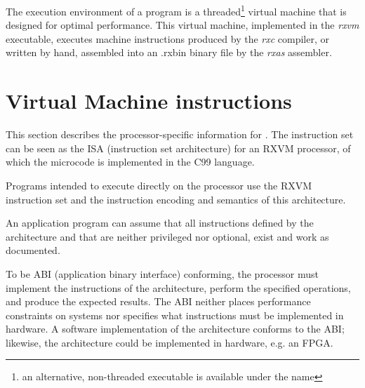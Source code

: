 The execution environment of a \crexx{} program is a
threaded\footnote{an alternative, non-threaded executable is available
  under the \emph{} name} virtual
machine that is designed for optimal performance. This virtual
machine, implemented in the \emph{rxvm} executable, executes
machine instructions produced by the \emph{rxc} \crexx{}
compiler, or written by hand, assembled into an .rxbin binary file by
the \emph{rxas} assembler.



\section{\crexx{} Virtual Machine instructions}

This section describes the processor-specific information for
. The instruction set can be seen as the ISA
(instruction set architecture) for
an RXVM processor, of which the microcode is implemented in the C99 language.

Programs intended to execute directly on the processor use the
RXVM instruction set and the
instruction encoding and semantics of this architecture.

An application program can assume that all instructions defined by the
architecture and that are neither privileged nor optional, exist and work
as documented.

To be ABI (application binary interface) conforming, the processor must implement the instructions of
the architecture, perform the specified operations, and produce the
expected results.  The ABI neither places performance constraints on
systems nor specifies what instructions must be implemented in
hardware.  A software implementation of the architecture conforms to
the ABI; likewise, the architecture could be implemented in hardware,
e.g. an FPGA.

